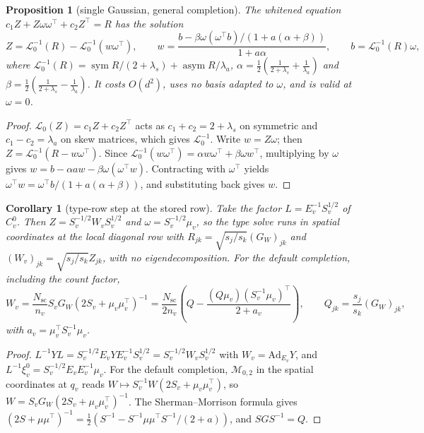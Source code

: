 \documentclass[11pt]{article}
\newtheorem{proposition}[theorem]{Proposition}
\newtheorem{corollary}[theorem]{Corollary}
\theoremstyle{definition}
\theoremstyle{remark}
\providecommand{\Ad}{\mathrm{Ad}}
\providecommand{\sym}{\operatorname{sym}}
\providecommand{\asym}{\operatorname{asym}}
\providecommand{\Nsc}{N_{\mathrm{sc}}}
\begin{document}
\begin{proposition}[single Gaussian, general completion]\label{frame:prop:woodbury}
The whitened equation $c_1Z+Z\omega\omega^\top+c_2Z^\top=R$ has the solution
\begin{equation}\label{frame:eq:woodbury}
Z=\mathcal{L}_0^{-1}(R)-\mathcal{L}_0^{-1}(w\omega^\top),\qquad w=\frac{b-\beta\omega(\omega^\top b)/(1+a(\alpha+\beta))}{1+a\alpha},\qquad b=\mathcal{L}_0^{-1}(R)\omega,
\end{equation}
where $\mathcal{L}_0^{-1}(R)=\sym R/(2+\lambda_s)+\asym R/\lambda_a$, $\alpha=\frac12(\frac1{2+\lambda_s}+\frac1{\lambda_a})$ and $\beta=\frac12(\frac1{2+\lambda_s}-\frac1{\lambda_a})$. It costs $O(d^2)$, uses no basis adapted to $\omega$, and is valid at $\omega=0$.
\end{proposition}
\begin{proof}
$\mathcal{L}_0(Z)=c_1Z+c_2Z^\top$ acts as $c_1+c_2=2+\lambda_s$ on symmetric and $c_1-c_2=\lambda_a$ on skew matrices, which gives $\mathcal{L}_0^{-1}$. Write $w=Z\omega$; then $Z=\mathcal{L}_0^{-1}(R-w\omega^\top)$. Since $\mathcal{L}_0^{-1}(w\omega^\top)=\alpha w\omega^\top+\beta\omega w^\top$, multiplying by $\omega$ gives $w=b-\alpha aw-\beta\omega(\omega^\top w)$. Contracting with $\omega^\top$ yields $\omega^\top w=\omega^\top b/(1+a(\alpha+\beta))$, and substituting back gives $w$.
\end{proof}

\begin{corollary}[type-row step at the stored row]\label{frame:cor:type}
Take the factor $L=E_v^{-1}S_v^{1/2}$ of $C^0_v$. Then $Z=S_v^{-1/2}W_vS_v^{1/2}$ and $\omega=S_v^{-1/2}\mu_v$, so the type solve runs in spatial coordinates at the local diagonal row with $R_{jk}=\sqrt{s_j/s_k}(G_W)_{jk}$ and $(W_v)_{jk}=\sqrt{s_j/s_k}Z_{jk}$, with no eigendecomposition. For the default completion, including the count factor,
\begin{equation}\label{frame:eq:type-step}
W_v=\frac{\Nsc}{n_v}S_vG_W\left(2S_v+\mu_v\mu_v^\top\right)^{-1}=\frac{\Nsc}{2n_v}\left(Q-\frac{(Q\mu_v)(S_v^{-1}\mu_v)^\top}{2+a_v}\right),\qquad Q_{jk}=\frac{s_j}{s_k}(G_W)_{jk},
\end{equation}
with $a_v=\mu_v^\top S_v^{-1}\mu_v$.
\end{corollary}
\begin{proof}
$L^{-1}YL=S_v^{-1/2}E_vYE_v^{-1}S_v^{1/2}=S_v^{-1/2}W_vS_v^{1/2}$ with $W_v=\Ad_{E_v}Y$, and $L^{-1}\xi^0_v=S_v^{-1/2}E_vE_v^{-1}\mu_v$. For the default completion, $\mathcal{M}_{0,2}$ in the spatial coordinates at $q_v$ reads $W\mapsto S_v^{-1}W(2S_v+\mu_v\mu_v^\top)$, so $W=S_vG_W(2S_v+\mu_v\mu_v^\top)^{-1}$. The Sherman--Morrison formula \cite{frame:ShermanMorrison1950} gives $(2S+\mu\mu^\top)^{-1}=\frac12\left(S^{-1}-S^{-1}\mu\mu^\top S^{-1}/(2+a)\right)$, and $SGS^{-1}=Q$.
\end{proof}
\end{document}

